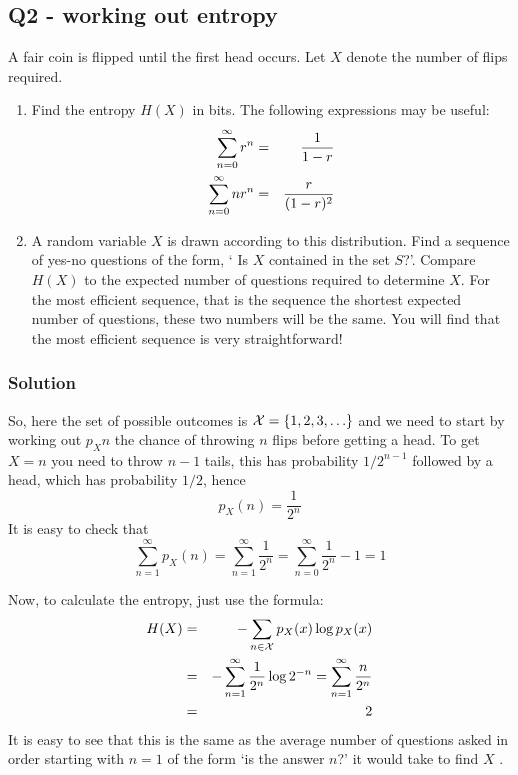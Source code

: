 \documentclass[12pt]{article}
\begin{document}
\subsection*{Q2 - working out entropy}

A fair coin is flipped until the first head occurs. Let $X$ denote the
number of flips required.
\begin{enumerate}
\item Find the entropy $H(X)$ in bits. The following expressions may be useful:\begin{eqnarray}
\sum_{n=0}^{\infty} r^n&=&\frac{1}{1-r}\cr
\sum_{n=0}^{\infty}nr^n&=&\frac{r}{(1-r)^2}
\end{eqnarray}
\item A random variable $X$ is drawn according to this
  distribution. Find a sequence of yes-no questions of the form, \lq
  Is $X$ contained in the set $S$?\rq{}. Compare $H(X)$ to the
  expected number of questions required to determine $X$. For the most
  efficient sequence, that is the sequence the shortest expected
  number of questions, these two numbers will be the same. You will
  find that the most efficient sequence is very straightforward!
\end{enumerate}

\subsubsection*{Solution}

So, here the set of possible outcomes is ${\cal X}=\{1,2,3,\ldots\}$ and we need to start by working out $p_X{n}$ the chance of throwing $n$ flips before getting a head. To get $X=n$ you need to throw $n-1$ tails, this has probability $1/2^{n-1}$ followed by a head, which has probability $1/2$, hence
\begin{equation}
p_X(n)=\frac{1}{2^n}
\end{equation}
It is easy to check that 
\begin{equation}
\sum_{n=1}^{\infty}p_X(n)=\sum_{n=1}^{\infty}\frac{1}{2^n}=\sum_{n=0}^{\infty}\frac{1}{2^n}-1=1
\end{equation}

Now, to calculate the entropy, just use the formula:
\begin{eqnarray}
H(X)&=&-\sum_{n\in {\cal X}}p_X(x)\log{p_X(x)}\cr
    &=&-\sum_{n=1}^{\infty}\frac{1}{2^n}\log{2^{-n}}=\sum_{n=1}^\infty\frac{n}{2^n}\cr
&=&2
\end{eqnarray}
It is easy to see that this is the same as the average number of questions asked in order starting with $n=1$ of the form \lq is the answer $n$?\rq{} it would take to find $X$ .
\end{document}
